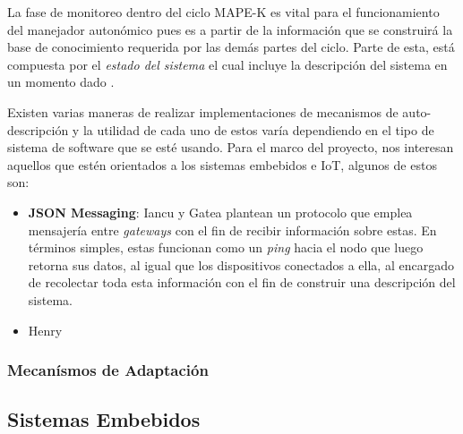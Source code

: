 \documentclass[12pt]{article}
\begin{document}

    La fase de monitoreo dentro del ciclo MAPE-K es vital para el funcionamiento del manejador autonómico pues es a partir de la información que se construirá la base de conocimiento requerida por las demás partes del ciclo. Parte de esta, está compuesta por el \textit{estado del sistema} el cual incluye la descripción del sistema en un momento dado \cite{Weiss2011}.

    Existen varias maneras de realizar implementaciones de mecanismos de auto-descripción y la utilidad de cada uno de estos varía dependiendo en el tipo de sistema de software que se esté usando. Para el marco del proyecto, nos interesan aquellos que estén orientados a los sistemas embebidos e IoT, algunos de estos son:
    
    \begin{itemize}
        \item \textbf{JSON Messaging}: Iancu y Gatea \citeyear{Iancu2022} plantean un protocolo que emplea mensajería entre \textit{gateways} con el fin de recibir información sobre estas. En términos simples, estas funcionan como un \textit{ping} hacia el nodo que luego retorna sus datos, al igual que los dispositivos conectados a ella, al encargado de recolectar toda esta información con el fin de construir una descripción del sistema.
        \item Henry
    \end{itemize}
    

    \subsubsection{Mecanísmos de Adaptación}
    

    \subsection{Sistemas Embebidos}
    
\end{document}
